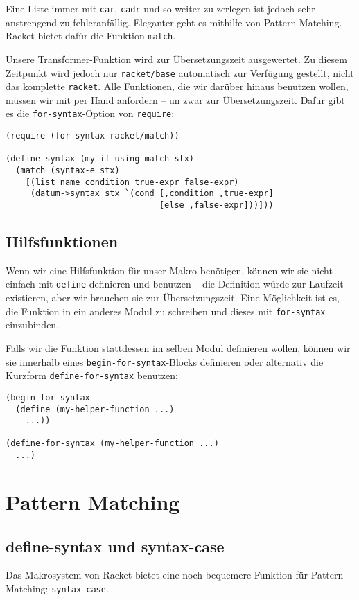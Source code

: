 Eine Liste immer mit \texttt{car}, \texttt{cadr} und so weiter zu zerlegen ist jedoch sehr anstrengend zu fehleranfällig. Eleganter geht es mithilfe von Pattern-Matching. Racket bietet dafür die Funktion \texttt{match}. 

Unsere Transformer-Funktion wird zur Übersetzungszeit ausgewertet. Zu diesem Zeitpunkt wird jedoch nur \texttt{racket/base} automatisch zur Verfügung gestellt, nicht das komplette \texttt{racket}. Alle Funktionen, die wir darüber hinaus benutzen wollen, müssen wir mit per Hand anfordern -- un zwar zur Übersetzungszeit. Dafür gibt es die \texttt{for-syntax}-Option von \texttt{require}:

\begin{lstlisting}
(require (for-syntax racket/match))

(define-syntax (my-if-using-match stx)
  (match (syntax-e stx)
    [(list name condition true-expr false-expr)
     (datum->syntax stx `(cond [,condition ,true-expr]
                               [else ,false-expr]))]))
\end{lstlisting}

\subsection{Hilfsfunktionen}
Wenn wir eine Hilfsfunktion für unser Makro benötigen, können wir sie nicht einfach mit \texttt{define} definieren und benutzen -- die Definition würde zur Laufzeit existieren, aber wir brauchen sie zur Übersetzungszeit. Eine Möglichkeit ist es, die Funktion in ein anderes Modul zu schreiben und dieses mit \texttt{for-syntax} einzubinden.

Falls wir die Funktion stattdessen im selben Modul definieren wollen, können wir sie innerhalb eines \texttt{begin-for-syntax}-Blocks definieren oder alternativ die Kurzform \texttt{define-for-syntax} benutzen:

\begin{lstlisting}
(begin-for-syntax
  (define (my-helper-function ...) 
    ...))
  
(define-for-syntax (my-helper-function ...)
  ...)
\end{lstlisting}

\section{Pattern Matching}
\subsection{define-syntax und syntax-case}
Das Makrosystem von Racket bietet eine noch bequemere Funktion für Pattern Matching: \texttt{syntax-case}.

